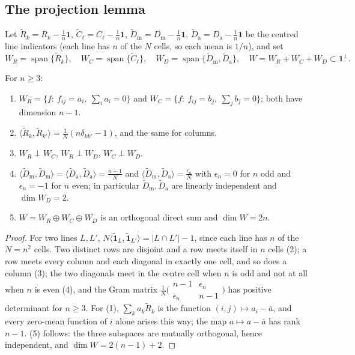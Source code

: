 \subsection{The projection lemma}
\label{sec:theory_projection}

Let $\tilde R_k=R_k-\frac1n\mathbf 1$, $\tilde C_\ell=C_\ell-\frac1n\mathbf 1$,
$\tilde D_{\mathrm m}=D_{\mathrm m}-\frac1n\mathbf 1$, $\tilde D_{\mathrm a}=D_{\mathrm a}-\frac1n\mathbf 1$
be the centred line indicators (each line has $n$ of the $N$ cells, so each mean is $1/n$), and set
\[
W_R=\operatorname{span}\{\tilde R_k\},\quad W_C=\operatorname{span}\{\tilde C_\ell\},\quad
W_D=\operatorname{span}\{\tilde D_{\mathrm m},\tilde D_{\mathrm a}\},\quad
W=W_R+W_C+W_D\subset\mathbf 1^{\perp}.
\]

\begin{lemma}[Structure of $W$]
\label{lem:W_structure}
For $n\ge 3$:
\begin{enumerate}
\item $W_R=\{f:\ f_{ij}=a_i,\ \sum_i a_i=0\}$ and $W_C=\{f:\ f_{ij}=b_j,\ \sum_j b_j=0\}$; both have dimension $n-1$.
\item $\langle\tilde R_k,\tilde R_{k'}\rangle=\frac1N(n\delta_{kk'}-1)$, and the same for columns.
\item $W_R\perp W_C$, $W_R\perp W_D$, $W_C\perp W_D$.
\item $\langle\tilde D_{\mathrm m},\tilde D_{\mathrm m}\rangle=\langle\tilde D_{\mathrm a},\tilde D_{\mathrm a}\rangle=\frac{n-1}{N}$ and
$\langle\tilde D_{\mathrm m},\tilde D_{\mathrm a}\rangle=\frac{\epsilon_n}{N}$ with $\epsilon_n=0$ for $n$ odd and
$\epsilon_n=-1$ for $n$ even; in particular $\tilde D_{\mathrm m},\tilde D_{\mathrm a}$ are linearly independent and $\dim W_D=2$.
\item $W=W_R\oplus W_C\oplus W_D$ is an orthogonal direct sum and $\dim W=2n$.
\end{enumerate}
\end{lemma}

\begin{proof}
For two lines $L,L'$, $N\langle\tilde{\mathbf 1}_L,\tilde{\mathbf 1}_{L'}\rangle=|L\cap L'|-1$, since each line has $n$ of the $N=n^2$ cells.
Two distinct rows are disjoint and a row meets itself in $n$ cells (2); a row meets every column and each diagonal in exactly one
cell, and so does a column (3); the two diagonals meet in the centre cell when $n$ is odd and not at all when $n$ is even (4),
and the Gram matrix $\frac1N\bigl(\begin{smallmatrix}n-1&\epsilon_n\\ \epsilon_n&n-1\end{smallmatrix}\bigr)$ has positive
determinant for $n\ge3$.  For (1), $\sum_ka_k\tilde R_k$ is the function $(i,j)\mapsto a_i-\bar a$, and every zero-mean
function of $i$ alone arises this way; the map $a\mapsto a-\bar a$ has rank $n-1$.  (5) follows: the three subspaces are
mutually orthogonal, hence independent, and $\dim W=2(n-1)+2$.
\end{proof}

